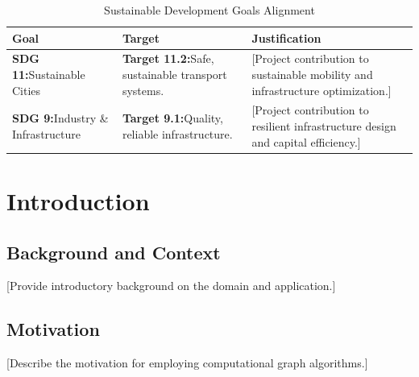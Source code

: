 \documentclass[12pt,a4paper]{report}
\begin{document}
\begin{table}[htbp]
\centering
\caption{Sustainable Development Goals Alignment}
\label{tab:sdg_template}
{\small\setlength{\tabcolsep}{4pt}
\begin{tabularx}{\textwidth}{>{\raggedright\arraybackslash}p{2.6cm}>{\raggedright\arraybackslash}p{3.8cm}X}
\toprule
\textbf{Goal} & \textbf{Target} & \textbf{Justification} \\
\midrule
\textbf{SDG 11:}\newline Sustainable Cities & 
\textbf{Target 11.2:}\newline Safe, sustainable transport systems. & 
[Project contribution to sustainable mobility and infrastructure optimization.] \\
\addlinespace
\textbf{SDG 9:}\newline Industry \& Infrastructure & 
\textbf{Target 9.1:}\newline Quality, reliable infrastructure. & 
[Project contribution to resilient infrastructure design and capital efficiency.] \\
\bottomrule
\end{tabularx}}
\end{table}

\newpage
{}
\tableofcontents

\newpage
\begingroup
\let\clearpage\relax
\listoffigures
\vspace{0.8cm}
\listoftables
\endgroup

\newpage
{}
\setcounter{page}{1}

\chapter{Introduction}
\label{chap:intro}

\section{Background and Context}
[Provide introductory background on the domain and application.]

\section{Motivation}
[Describe the motivation for employing computational graph algorithms.]
\end{document}
